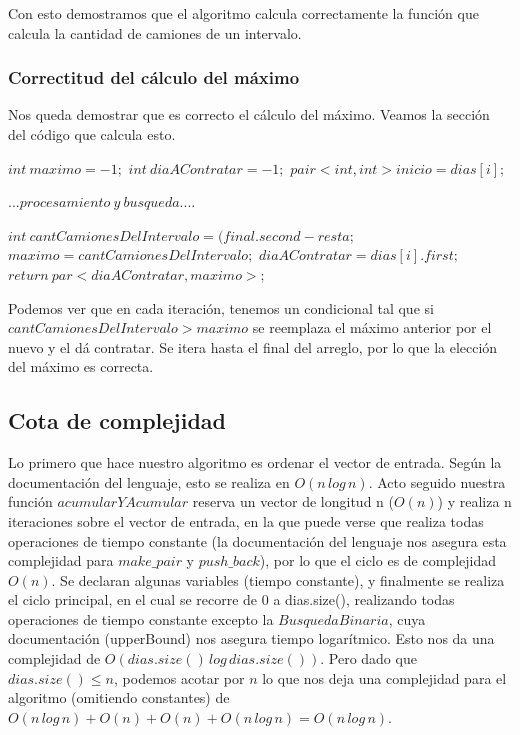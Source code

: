 \vspace{2mm}

Con esto demostramos que el algoritmo calcula correctamente la funci\'on que calcula la cantidad de camiones de un intervalo.



\subsubsection{Correctitud del c\'alculo del m\'aximo}

Nos queda demostrar que es correcto el c\'alculo del m\'aximo. Veamos la secci\'on del c\'odigo que calcula esto. 
\begin{algorithmic}[1]
\Statex
	\State $int \: maximo=-1;$
	\State $int \: diaAContratar=-1;$
	    \State $pair<int, int> inicio = dias[i];$

	    \State$... procesamiento \: y \: busqueda.... $
		
		\State $int \: cantCamionesDelIntervalo = (final.second-resta;$
			\State $maximo=cantCamionesDelIntervalo;$	
			\State $diaAContratar = dias[i].first;$
		\EndIf
	\EndFor
	\State $return \: par<diaAContratar, maximo>;$
	\Statex

	\end{algorithmic}

	Podemos ver que en cada iteraci\'on, tenemos un condicional tal que si $cantCamionesDelIntervalo>maximo$ se reemplaza el m\'aximo anterior por el nuevo y el d\'a contratar. Se itera hasta el final del arreglo, por lo que la elecci\'on del m\'aximo es correcta.


\subsection{Cota de complejidad}

Lo primero que hace nuestro algoritmo es ordenar el vector de entrada. Seg\'un la documentaci\'on del lenguaje, esto se realiza en $O(n\, log \, n)$. Acto seguido nuestra funci\'on $acumularYAcumular$ reserva un vector de longitud n ($O(n)$) y realiza n iteraciones sobre el vector de entrada, en la que puede verse que realiza todas operaciones de tiempo constante (la documentaci\'on del lenguaje nos asegura esta complejidad para $make\_pair$ y $push\_back$), por lo que el ciclo es de complejidad $O(n)$. Se declaran algunas variables (tiempo constante), y finalmente se realiza el ciclo principal, en el cual se recorre de 0 a dias.size(), realizando todas operaciones de tiempo constante excepto la $BusquedaBinaria$, cuya documentaci\'on (upperBound) nos asegura tiempo logar\'itmico. Esto nos da una complejidad de $O(dias.size() \, log \, dias.size())$. Pero dado que $dias.size() \leq n$, podemos acotar por $n$ lo que nos deja una complejidad para el algoritmo (omitiendo constantes) de $O(n\, log \, n) + O(n)+  O(n) + O(n\, log \, n) = O(n\, log \, n) $.


